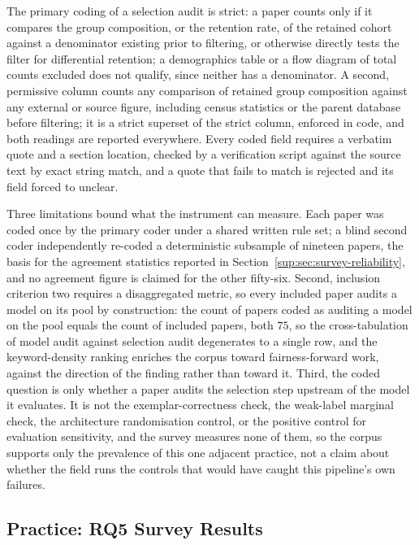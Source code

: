 The primary coding of a selection audit is strict: a paper counts only if it compares the group
composition, or the retention rate, of the retained cohort against a denominator existing prior to
filtering, or otherwise directly tests the filter for differential retention; a demographics table
or a flow diagram of total counts excluded does not qualify, since neither has a denominator. A
second, permissive column counts any comparison of retained group composition against any external
or source figure, including census statistics or the parent database before filtering; it is a
strict superset of the strict column, enforced in code, and both readings are reported everywhere.
Every coded field requires a verbatim quote and a section location, checked by a verification
script against the source text by exact string match, and a quote that fails to match is rejected
and its field forced to unclear.

Three limitations bound what the instrument can measure. Each paper was coded once by the primary
coder under a shared written rule set; a blind second coder independently re-coded a deterministic
subsample of nineteen papers, the basis for the agreement statistics reported in
Section~\ref{sup:sec:survey-reliability}, and no agreement figure is claimed for the other fifty-six. Second,
inclusion criterion two requires a disaggregated metric, so every included paper audits a model on
its pool by construction: the count of papers coded as auditing a model on the pool equals the count
of included papers, both $75$, so the cross-tabulation of model audit against selection audit
degenerates to a single row, and the keyword-density ranking enriches the corpus toward
fairness-forward work, against the direction of the finding rather than toward it. Third, the coded
question is only whether a paper audits the selection step upstream of the model it evaluates. It is
not the exemplar-correctness check, the weak-label marginal check, the architecture randomisation
control, or the positive control for evaluation sensitivity, and the survey measures none of them,
so the corpus supports only the prevalence of this one adjacent practice, not a claim about whether
the field runs the controls that would have caught this pipeline's own failures.



\subsection{Practice: RQ5 Survey Results}
\label{sup:sec:res-rq5}

